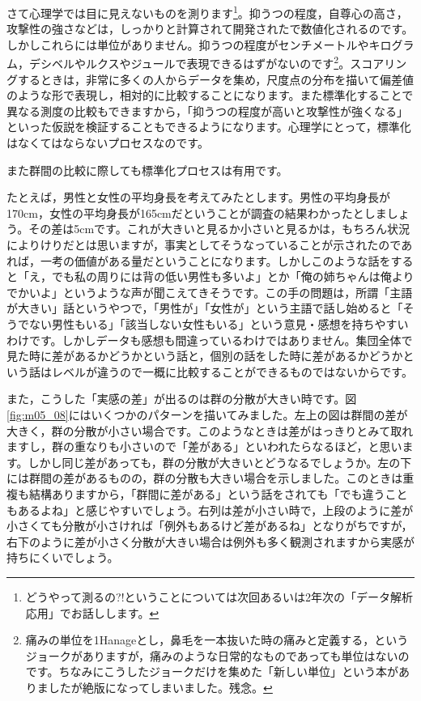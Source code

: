 \documentclass{ltjbook}
\begin{document}
さて心理学では目に見えないものを測ります\footnote{どうやって測るの?!ということについては次回あるいは2年次の「データ解析応用」でお話しします。}。抑うつの程度，自尊心の高さ，攻撃性の強さなどは，しっかりと計算されて開発されたで数値化されるのです。しかしこれらには単位がありません。抑うつの程度がセンチメートルやキログラム，デシベルやルクスやジュールで表現できるはずがないのです\footnote{痛みの単位を1Hanageとし，鼻毛を一本抜いた時の痛みと定義する，というジョークがありますが，痛みのような日常的なものであっても単位はないのです。ちなみにこうしたジョークだけを集めた「新しい単位」\parencite{Hanage2017}という本がありましたが絶版になってしまいました。残念。}。スコアリングするときは，非常に多くの人からデータを集め，尺度点の分布を描いて偏差値のような形で表現し，相対的に比較することになります。また標準化することで異なる測度の比較もできますから，「抑うつの程度が高いと攻撃性が強くなる」といった仮説を検証することもできるようになります。心理学にとって，標準化はなくてはならないプロセスなのです。

また群間の比較に際しても標準化プロセスは有用です。

たとえば，男性と女性の平均身長を考えてみたとします。男性の平均身長が170cm，女性の平均身長が165cmだということが調査の結果わかったとしましょう。その差は5cmです。これが大きいと見るか小さいと見るかは，もちろん状況によりけりだとは思いますが，事実としてそうなっていることが示されたのであれば，一考の価値がある量だということになります。しかしこのような話をすると「え，でも私の周りには背の低い男性も多いよ」とか「俺の姉ちゃんは俺よりでかいよ」というような声が聞こえてきそうです。この手の問題は，所謂「主語が大きい」話というやつで，「男性が」「女性が」という主語で話し始めると「そうでない男性もいる」「該当しない女性もいる」という意見・感想を持ちやすいわけです。しかしデータも感想も間違っているわけではありません。集団全体で見た時に差があるかどうかという話と，個別の話をした時に差があるかどうかという話はレベルが違うので一概に比較することができるものではないからです。

また，こうした「実感の差」が出るのは群の分散が大きい時です。図\ref{fig:m05_08}にはいくつかのパターンを描いてみました。左上の図は群間の差が大きく，群の分散が小さい場合です。このようなときは差がはっきりとみて取れますし，群の重なりも小さいので「差がある」といわれたらなるほど，と思います。しかし同じ差があっても，群の分散が大きいとどうなるでしょうか。左の下には群間の差があるものの，群の分散も大きい場合を示しました。このときは重複も結構ありますから，「群間に差がある」という話をされても「でも違うこともあるよね」と感じやすいでしょう。右列は差が小さい時で，上段のように差が小さくても分散が小さければ「例外もあるけど差があるね」となりがちですが，右下のように差が小さく分散が大きい場合は例外も多く観測されますから実感が持ちにくいでしょう。
\end{document}
